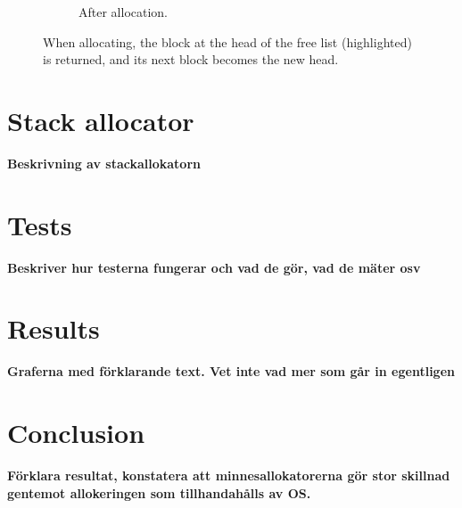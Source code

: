 \documentclass{article}
\begin{document}
\begin{figure}[h]
\begin{subfigure}{.5\textwidth}
        \caption{After allocation.}
        \label{fig:pool_allocation_after}
    \end{subfigure}
    \caption{When allocating, the block at the head of the free list (highlighted) is returned, and its next block becomes the new head.}
    \label{fig:pool_allocation}
\end{figure}

\section{Stack allocator}
\textbf{\large Beskrivning av stackallokatorn}

\section{Tests}
\textbf{\large Beskriver hur testerna fungerar och vad de gör, vad de mäter osv}

\section{Results}
\textbf{\large Graferna med förklarande text. Vet inte vad mer som går in egentligen}

\section{Conclusion}
\textbf{\large Förklara resultat, konstatera att minnesallokatorerna gör stor skillnad gentemot allokeringen som tillhandahålls av OS.}
\end{document}
